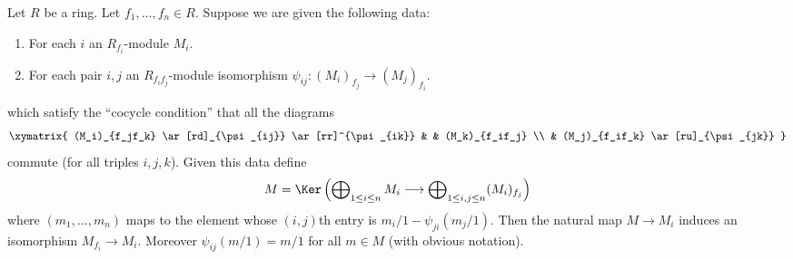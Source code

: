 \begin{lemma}
\label{lemma-glue-modules}
Let $R$ be a ring. Let $f_1, \ldots, f_n \in R$. Suppose we are given
the following data:
\begin{enumerate}
\item For each $i$ an $R_{f_i}$-module $M_i$.
\item For each pair $i, j$ an $R_{f_if_j}$-module isomorphism
$\psi_{ij} : (M_i)_{f_j} \to (M_j)_{f_i}$.
\end{enumerate}
which satisfy the ``cocycle condition'' that all the diagrams
$$
\xymatrix{
(M_i)_{f_jf_k}
\ar[rd]_{\psi_{ij}}
\ar[rr]^{\psi_{ik}}
& &
(M_k)_{f_if_j} \\
&
(M_j)_{f_if_k} \ar[ru]_{\psi_{jk}}
}
$$
commute (for all triples $i, j, k$). Given this data define
$$
M = \Ker\left(
\bigoplus\nolimits_{1 \leq i \leq n} M_i
\longrightarrow
\bigoplus\nolimits_{1 \leq i, j \leq n} (M_i)_{f_j}
\right)
$$
where $(m_1, \ldots, m_n)$ maps to the element whose
$(i, j)$th entry is $m_i/1 - \psi_{ji}(m_j/1)$.
Then the natural map $M \to M_i$ induces an isomorphism
$M_{f_i} \to M_i$. Moreover $\psi_{ij}(m/1) = m/1$
for all $m \in M$ (with obvious notation).
\end{lemma}

